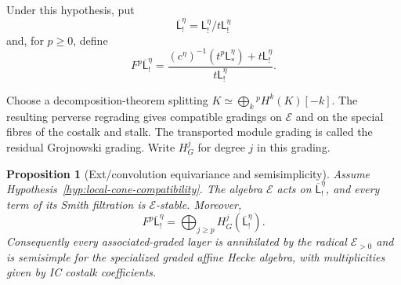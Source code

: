 \documentclass[10pt,a4paper]{amsart}
\newtheorem{proposition}[theorem]{Proposition}
\begin{document}
Under this hypothesis, put
\[
 \overline{\mathsf L}_!^\eta=
 \mathsf L_!^\eta/t\mathsf L_!^\eta
\]
and, for $p\geq0$, define
\[
 F^p\overline{\mathsf L}_!^\eta=
 \frac{(c^\eta)^{-1}(t^p\mathsf L_*^\eta)+
       t\mathsf L_!^\eta}{t\mathsf L_!^\eta}.
\]

Choose a decomposition-theorem splitting
$K\simeq\bigoplus_k{}^pH^k(K)[-k]$.  The resulting perverse regrading gives
compatible gradings on $\mathcal E$ and on the special fibres of the
costalk and stalk.  The transported module grading is called the residual
Grojnowski grading.  Write $H_G^j$ for degree $j$ in this grading.

\begin{proposition}[Ext/convolution equivariance and semisimplicity]
\label{prop:ext-equivariance}
Assume Hypothesis~\ref{hyp:local-cone-compatibility}.
The algebra $\mathcal E$ acts on
$\overline{\mathsf L}_!^\eta$, and every term of its Smith filtration is
$\mathcal E$-stable.  Moreover,
\[
 F^p\overline{\mathsf L}_!^\eta=
 \bigoplus_{j\geq p}H_G^j(\overline{\mathsf L}_!^\eta).
\]
Consequently every associated-graded layer is annihilated by the radical
$\mathcal E_{>0}$ and is semisimple for the specialized graded affine Hecke
algebra, with multiplicities given by IC costalk coefficients.
\end{proposition}
\end{document}
